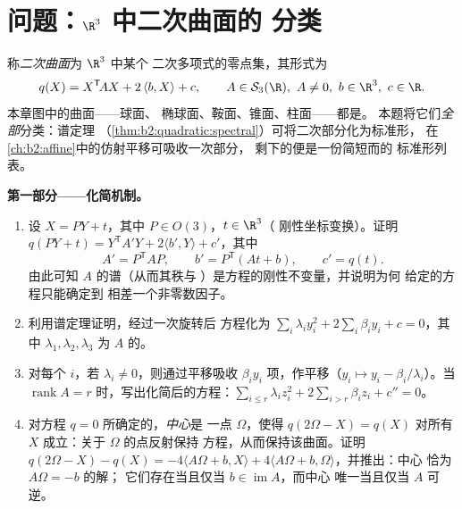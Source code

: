 \section{问题：$\R^3$ 中二次曲面的
分类}

\begin{problem}\label{pb:b2:surfaces:1}
称\emph{二次曲面}为 $\R^3$ 中某个
二次多项式的零点集，其形式为
\[
q(X) = X^{\mathsf T}\!AX + 2\,\langle b, X\rangle + c,
\qquad A \in \mathcal S_3(\R),\ A \neq 0,\ b \in \R^3,\
c \in \R .
\]
本章图中的曲面——球面、
椭球面、鞍面、锥面、柱面——都是。
本题将它们\emph{全部}分类：谱定理
（\cref{thm:b2:quadratic:spectral}）可将二次部分化为标准形，
在\cref{ch:b2:affine}中的仿射平移可吸收一次部分，
剩下的便是一份简短而的
标准形列表。

\medskip
\noindent\textbf{第一部分——化简机制。}
\begin{enumerate}
  \item 设 $X = PY + t$，其中 $P \in O(3)$，$t \in \R^3$（
        刚性坐标变换）。证明 $q(PY + t) =
        Y^{\mathsf T}\!A'Y + 2\langle b', Y\rangle + c'$，其中
        \[
        A' = P^{\mathsf T}\!AP, \qquad
        b' = P^{\mathsf T}(At + b), \qquad
        c' = q(t) .
        \]
        由此可知 $A$ 的谱（从而其秩与
        ）是方程的刚性不变量，并说明为何
        给定\omterm{pb:b2:surfaces:1}{二次曲面}的方程只能确定到
        相差一个非零数因子。
  \item 利用谱定理证明，经过一次旋转后
        方程化为 $\sum_i \lambda_i y_i^2 +
        2\sum_i\beta_iy_i + c = 0$，其中 $\lambda_1, \lambda_2,
        \lambda_3$ 为 $A$ 的。
  \item 对每个 $i$，若 $\lambda_i \neq 0$，则通过平移吸收
        $\beta_iy_i$ 项，作平移（$y_i \mapsto y_i -
        \beta_i/\lambda_i$）。当
        $\operatorname{rank} A = r$ 时，写出化简后的方程：$\sum_{i\leq r}\lambda_i
        z_i^2 + 2\sum_{i > r}\beta_iz_i + c'' = 0$。
  \item 对方程 $q = 0$ 所确定的，\emph{中心}是
        一点 $\Omega$，使得 $q(2\Omega - X) = q(X)$ 对所有
        $X$ 成立：关于 $\Omega$ 的点反射保持
        方程，从而保持该曲面。证明 $q(2\Omega - X)
        - q(X) = -4\langle A\Omega + b, X\rangle + 4\langle
        A\Omega + b, \Omega\rangle$，并推出：中心
        恰为 $A\Omega = -b$ 的解；
        它们存在当且仅当 $b \in \operatorname{im}A$，而中心
        唯一当且仅当 $A$ 可逆。
\end{enumerate}


\end{problem}
